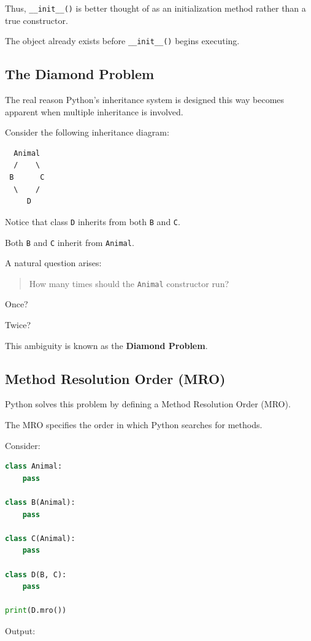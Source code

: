 \documentclass[11pt]{article}
\begin{document}
Thus, \verb|__init__()| is better thought of as an initialization method rather than a true constructor.

The object already exists before \verb|__init__()| begins executing.

\subsection{The Diamond Problem}

The real reason Python’s inheritance system is designed this way becomes apparent when multiple inheritance is involved.

Consider the following inheritance diagram:

\begin{verbatim}
  Animal
  /    \
 B      C
  \    /
     D
\end{verbatim}

Notice that class \texttt{D} inherits from both \texttt{B} and \texttt{C}.

Both \texttt{B} and \texttt{C} inherit from \texttt{Animal}.

A natural question arises:

\begin{quote}
How many times should the \texttt{Animal} constructor run?
\end{quote}

Once?

Twice?

This ambiguity is known as the \textbf{Diamond Problem}.

\subsection{Method Resolution Order (MRO)}

Python solves this problem by defining a Method Resolution Order (MRO).

The MRO specifies the order in which Python searches for methods.

Consider:

\begin{lstlisting}[language=Python]
class Animal:
    pass

class B(Animal):
    pass

class C(Animal):
    pass

class D(B, C):
    pass

print(D.mro())
\end{lstlisting}

Output:
\end{document}
